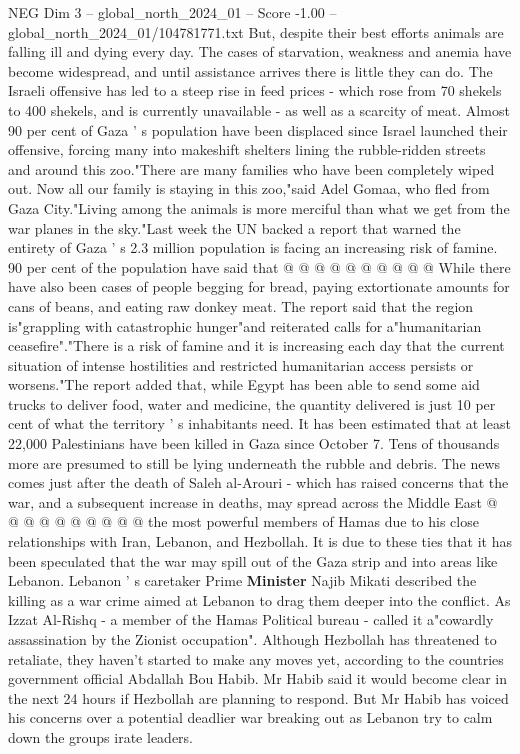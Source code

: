 \begin{textsample}{NEG Dim 3 – global\_north\_2024\_01 – Score -1.00 – global\_north\_2024\_01/104781771.txt}  \label{ex:f3_neg_218}
But, despite their best efforts animals are falling ill and dying every day.
The cases of starvation, weakness and anemia have become widespread, and until assistance arrives there is little they can do.
The Israeli offensive has led to a steep rise in feed prices - which rose from 70 shekels to 400 shekels, and is currently unavailable - as well as a scarcity of meat.
Almost 90 per cent of Gaza ' s population have been displaced since Israel launched their offensive, forcing many into makeshift shelters lining the rubble-ridden streets and around this zoo."There are many families who have been completely wiped out.
Now all our family is staying in this zoo,"said Adel Gomaa, who fled from Gaza City."Living among the animals is more merciful than what we get from the war planes in the sky."Last week the UN backed a report that warned the entirety of Gaza ' s 2.3 million population is facing an increasing risk of famine. 90 per cent of the population have said that @ @ @ @ @ @ @ @ @ @ While there have also been cases of people begging for bread, paying extortionate amounts for cans of beans, and eating raw donkey meat.
The report said that the region is"grappling with catastrophic hunger"and reiterated calls for a"humanitarian ceasefire"."There is a risk of famine and it is increasing each day that the current situation of intense hostilities and restricted humanitarian access persists or worsens."The report added that, while Egypt has been able to send some aid trucks to deliver food, water and medicine, the quantity delivered is just 10 per cent of what the territory ' s inhabitants need.
It has been estimated that at least 22,000 Palestinians have been killed in Gaza since October 7.
Tens of thousands more are presumed to still be lying underneath the rubble and debris.
The news comes just after the death of Saleh al-Arouri - which has raised concerns that the war, and a subsequent increase in deaths, may spread across the Middle East @ @ @ @ @ @ @ @ @ @ the most powerful members of Hamas due to his close relationships with Iran, Lebanon, and Hezbollah.
It is due to these ties that it has been speculated that the war may spill out of the Gaza strip and into areas like Lebanon.
Lebanon ' s caretaker Prime \textbf{Minister} Najib Mikati described the killing as a war crime aimed at Lebanon to drag them deeper into the conflict.
As Izzat Al-Rishq - a member of the Hamas Political bureau - called it a"cowardly assassination by the Zionist occupation".
Although Hezbollah has threatened to retaliate, they haven't started to make any moves yet, according to the countries government official Abdallah Bou Habib.
Mr Habib said it would become clear in the next 24 hours if Hezbollah are planning to respond.
But Mr Habib has voiced his concerns over a potential deadlier war breaking out as Lebanon try to calm down the groups irate leaders.

\end{textsample}
